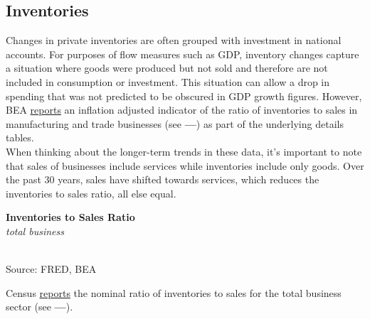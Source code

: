\documentclass{report}
\makeatletter
\newcommand{\tbllink}[1]{\href{https://raw.githubusercontent.com/bdecon/US-chartbook/master/chartbook/data/#1}{\faTable}}
\newcommand*\short[1]{\expandafter\@gobbletwo\number\numexpr#1\relax}
\newcommand{\shdateaxisticks}{
		date coordinates in=x, axis line style={draw=none},
		xmax={2021-01-01},
		max space between ticks=40,	    
		xtick={{1990-01-01}, {1995-01-01}, {2000-01-01}, 
			{2005-01-01}, {2010-01-01}, {2015-01-01}, {2020-01-01}},
		minor xtick={},
		enlarge y limits={0.06}, enlarge x limits={0.01},
		}
\newcommand{\stdline}[4]{\addplot[very thick, no markers, color=#1] 
		table [x=#2, y=#3, col sep=comma] {#4};	}
\newcommand{\rbars}{
		\fill[color=black!10] (axis cs:{1990-07-01},\pgfkeysvalueof{/pgfplots/ymin}) rectangle 
			(axis cs:{1991-03-01}, \pgfkeysvalueof{/pgfplots/ymax});
		\fill[color=black!10] (axis cs:{2007-12-01},\pgfkeysvalueof{/pgfplots/ymin}) rectangle 
			(axis cs:{2009-07-01}, \pgfkeysvalueof{/pgfplots/ymax});
		\fill[color=black!10] (axis cs:{2001-03-01},\pgfkeysvalueof{/pgfplots/ymin}) rectangle 
			(axis cs:{2001-11-01}, \pgfkeysvalueof{/pgfplots/ymax});
		\fill[color=black!10] (axis cs:{2020-02-01},\pgfkeysvalueof{/pgfplots/ymin}) rectangle 
			(axis cs:{2020-09-01}, \pgfkeysvalueof{/pgfplots/ymax});}
\makeatother
\begin{document}
{{{{\subsection*{\color{black!70} \seriffont Inventories}
\begin{minipage}{0.76\textwidth}
\small Changes in private inventories are often grouped with investment in national accounts. For purposes of flow measures such as GDP, inventory changes capture a situation where goods were produced but not sold and therefore are not included in consumption or investment. This situation can allow a drop in spending that was not predicted to be obscured in GDP growth figures. However, BEA \href{https://apps.bea.gov/iTable/index_UD.cfm}{reports} an inflation adjusted indicator of the ratio of inventories to sales in manufacturing and trade businesses (see {\color{blue!60!green}\textbf{---}}) as part of the underlying details tables. \\

When thinking about the longer-term trends in these data, it's important to note that sales of businesses include services while inventories include only goods. Over the past 30 years, sales have shifted towards services, which reduces the inventories to sales ratio, all else equal. 

\end{minipage}
\vspace{1mm}

\begin{minipage}{0.4\textwidth}
\noindent \normalsize \textbf{Inventories to Sales Ratio}\\
\footnotesize{\textit{total business}}\\ 
\noindent \hspace*{-2mm} \\
\footnotesize{Source: FRED, BEA} \hfill \tbllink{isratio.csv}\\
\end{minipage} \hspace{8mm}
\begin{minipage}{0.31\textwidth}
\small Census \href{https://www.census.gov/mtis/www/data/pdf/mtis_current.pdf}{reports} the nominal ratio of inventories to sales for the total business sector (see {\color{blue!40!cyan!80!white}\textbf{---}}). 
\end{minipage}



}}}}
\end{document}
